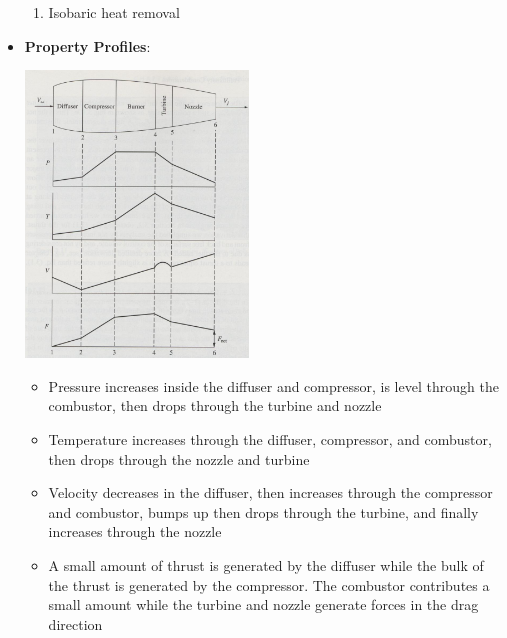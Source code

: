 \documentclass[11pt]{article}
\newcommand{\Item}[1]{\item \textbf{#1}:}
\begin{document}
\begin{itemize}
\begin{minipage}{0.48\textwidth}
\begin{enumerate}
	\item Isobaric heat removal
	\end{enumerate}
\end{minipage}
\vspace{1cm}
\Item{Property Profiles}\\
\begin{minipage}{0.48\textwidth}
	\includegraphics[height = 3in]{Graphics/engine_profiles.png}
\end{minipage}
\begin{minipage}{0.48\textwidth}
	\begin{itemize}
	\item Pressure increases inside the diffuser and compressor, is level through the combustor, then drops through the turbine and nozzle
	\item Temperature increases through the diffuser, compressor, and combustor, then drops through the nozzle and turbine
	\item Velocity decreases in the diffuser, then increases through the compressor and combustor, bumps up then drops through the turbine, and finally increases through the nozzle
	\item A small amount of thrust is generated by the diffuser while the bulk of the thrust is generated by the compressor. The combustor contributes a small amount while the turbine and nozzle generate forces in the drag direction
	\end{itemize}
\end{minipage}
\end{itemize}
\vspace{1cm}
\end{document}
